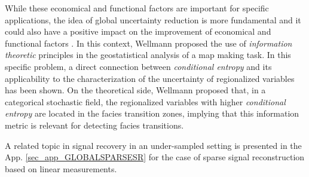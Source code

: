 While these economical and functional factors are important for specific applications, the idea of global uncertainty reduction is more fundamental and it could also have a positive impact on the improvement of economical and functional factors \citep{Krause_2006}. In this context, Wellmann \citep{wellman_2013} proposed the use of \emph{information theoretic} principles in the geostatistical analysis of a map making task. In this specific problem, a direct connection between \emph{conditional entropy} and its applicability to the characterization of the uncertainty of regionalized variables has been shown. On the theoretical side, Wellmann \citep{wellman_2013} proposed that, in a categorical stochastic field, the regionalized variables with higher \emph{conditional entropy} are located in the facies transition zones, implying that this information metric is relevant for detecting facies transitions.

A related topic in signal recovery in an under-sampled setting is presented in the App. \ref{sec_app_GLOBALSPARSESR} for the case of sparse signal reconstruction based on linear measurements. 





